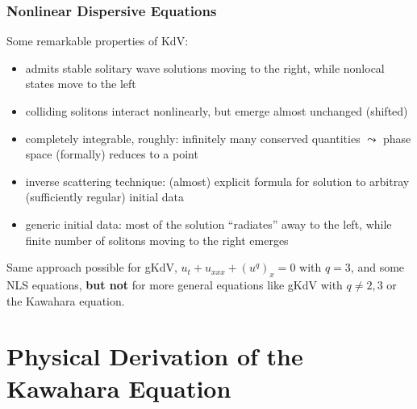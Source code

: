 \documentclass[9pt, english]{beamer}
\theoremstyle{definition}
\begin{document}
\begin{frame}
  \frametitle{Nonlinear Dispersive Equations}
Some remarkable properties of KdV:
\begin{itemize}
 \item admits stable solitary wave solutions moving to the right, while nonlocal states move to the left
 \item colliding solitons interact nonlinearly, but emerge almost unchanged (shifted)
 \item completely integrable, roughly: infinitely many conserved quantities $\leadsto$ phase space (formally) reduces to
a point
 \item inverse scattering technique: (almost) explicit formula for solution to arbitray (sufficiently regular) initial
data
 \item generic initial data: most of the solution ``radiates'' away to the left, while finite number of solitons moving
to the right emerges
\end{itemize}
Same approach possible for gKdV, $u_t + u_{xxx} + (u^q)_x = 0$ with
$q=3$, and some NLS equations, {\bf but not} for more general
equations like gKdV with $q\not=2,3$ or the Kawahara equation.
\end{frame}

\section{Physical Derivation of the Kawahara Equation}
\end{document}
